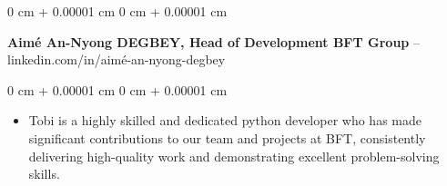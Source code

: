 \documentclass[10pt, letterpaper]{article}
\newenvironment{highlights}{
    \begin{itemize}[
        topsep=0.10 cm,
        parsep=0.10 cm,
        partopsep=0pt,
        itemsep=0pt,
        leftmargin=0 cm + 10pt
    ]
}{
    \end{itemize}
} %
\newenvironment{onecolentry}{
    \begin{adjustwidth}{
        0 cm + 0.00001 cm
    }{
        0 cm + 0.00001 cm
    }
}{
    \end{adjustwidth}
} %
\begin{document}
        
        \begin{onecolentry}
            \textbf{Aimé An-Nyong DEGBEY, Head of Development BFT Group} -- linkedin.com/in/aimé-an-nyong-degbey\end{onecolentry}

        \vspace{0.10 cm}
        \begin{onecolentry}
            \begin{highlights}
                \item Tobi is a highly skilled and dedicated python developer who has made significant contributions to our team and projects at BFT, consistently delivering high-quality work and demonstrating excellent problem-solving skills.
            \end{highlights}
        \end{onecolentry}



    
\end{document}
